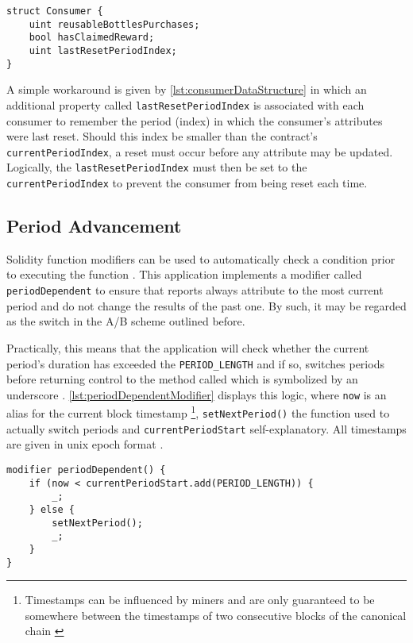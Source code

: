 \begin{lstlisting}[language=Solidity, caption=Consumer data structure, label=lst:consumerDataStructure]
struct Consumer {
	uint reusableBottlesPurchases;
	bool hasClaimedReward;
	uint lastResetPeriodIndex;
}
\end{lstlisting}

A simple workaround is given by \autoref{lst:consumerDataStructure} in which an additional property called \texttt{lastResetPeriodIndex} is associated with each consumer to remember the period (index) in which the consumer's attributes were last reset. Should this index be smaller than the contract's \texttt{currentPeriodIndex}, a reset must occur before any attribute may be updated. Logically, the \texttt{lastResetPeriodIndex} must then be set to the \texttt{currentPeriodIndex} to prevent the consumer from being reset each time.

\subsection{Period Advancement}
Solidity function modifiers can be used to automatically check a condition prior to executing the function \cite[p.~79]{solidityDocs}. This application implements a modifier called \texttt{periodDependent} to ensure that reports always attribute to the most current period and do not change the results of the past one. By such, it may be regarded as the switch in the A/B scheme outlined before.

Practically, this means that the application will check whether the current period's duration has exceeded the \texttt{PERIOD\_LENGTH} and if so, switches periods before returning control to the method called which is symbolized by an underscore \cite[p.~81]{solidityDocs}. \autoref{lst:periodDependentModifier} displays this logic, where \texttt{now} is an alias for the current block timestamp \footnote{Timestamps can be influenced by miners and are only guaranteed to be somewhere between the timestamps of two consecutive blocks of the canonical chain \cite[p.~65]{solidityDocs}}, \texttt{setNextPeriod()} the function used to actually switch periods and \texttt{currentPeriodStart} self-explanatory. All timestamps are given in unix epoch format \cite[p.~29]{solidityDocs}. 

\begin{lstlisting}[language=Solidity, caption=Function modifier to advance period, label=lst:periodDependentModifier]
modifier periodDependent() {	
	if (now < currentPeriodStart.add(PERIOD_LENGTH)) {
		_;
	} else {
		setNextPeriod();
		_;
	}
}
\end{lstlisting}


